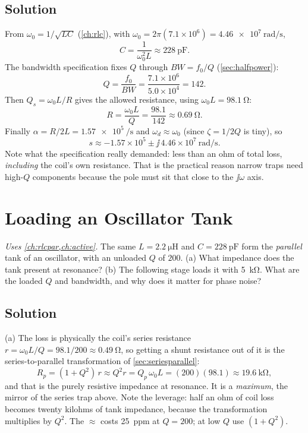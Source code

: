 \subsection*{Solution}
From \(\omega_0=1/\sqrt{LC}\) (\cref{ch:rlc}), with
\(\omega_0=2\pi(7.1\times10^6)=\SI{4.46e7}{\radian\per\second}\),
\[
C=\frac{1}{\omega_0^2L}\approx\SI{228}{\pico\farad}.
\]
The bandwidth specification fixes \(Q\) through \(BW=f_0/Q\) (\cref{sec:halfpower}):
\[
Q=\frac{f_0}{BW}=\frac{7.1\times10^6}{5.0\times10^4}=142 .
\]
Then \(Q_s=\omega_0L/R\) gives the allowed resistance, using
\(\omega_0L=\SI{98.1}{\ohm}\):
\[
R=\frac{\omega_0L}{Q}=\frac{98.1}{142}\approx\SI{0.69}{\ohm}.
\]
Finally \(\alpha=R/2L=\SI{1.57e5}{\per\second}\) and \(\omega_d\approx\omega_0\)
(since \(\zeta=1/2Q\) is tiny), so
\[
s\approx-1.57\times10^{5}\pm\jj\,4.46\times10^{7}\ \si{\radian\per\second}.
\]
Note what the specification really demanded: less than an ohm of total loss,
\emph{including} the coil's own resistance. That is the practical reason narrow traps
need high-\(Q\) components because the pole must sit that close to the
\(\jj\omega\) axis.

\section{Loading an Oscillator Tank}
\emph{Uses \cref{ch:rlcpar,ch:active}.} The same \(L=\SI{2.2}{\micro\henry}\) and
\(C=\SI{228}{\pico\farad}\) form the \emph{parallel} tank of an oscillator, with an
unloaded \(Q\) of \(200\). (a) What impedance does the tank present at resonance?
(b) The following stage loads it with \SI{5}{\kilo\ohm}. What are the loaded \(Q\) and
bandwidth, and why does it matter for phase noise?

\subsection*{Solution}
(a) The loss is physically the coil's series resistance
\(r=\omega_0L/Q=98.1/200\approx\SI{0.49}{\ohm}\), so getting a shunt resistance out of
it is the series-to-parallel transformation of \cref{sec:seriesparallel}:
\[
R_p=(1+Q^2)\,r\approx Q^2r=Q_p\,\omega_0L=(200)(98.1)\approx\SI{19.6}{\kilo\ohm},
\]
and that is the purely resistive impedance at resonance. It is a \emph{maximum}, the
mirror of the series trap above. Note the leverage: half an ohm of coil
loss becomes twenty kilohms of tank impedance, because the transformation multiplies
by \(Q^2\). The \(\approx\) costs \SI{25}{ppm} at \(Q=200\); at low \(Q\) use
\((1+Q^2)\).

